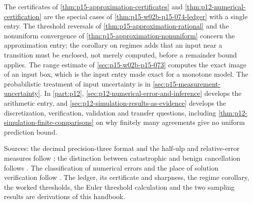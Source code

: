 The certificates of \cref{thm:p15-approximation-certificates} and
\cref{thm:p12-numerical-certification} are the special cases of
\cref{thm:p15-w02b-p15-074-ledger} with a single entry. The threshold
reversals of \cref{thm:p15-approximation-rational} and the nonuniform
convergence of \cref{thm:p15-approximation-nonuniform} concern the
approximation entry; the corollary on regimes adds that an input near a
transition must be enclosed, not merely computed, before a remainder bound
applies. The range estimate of \cref{sec:p15-w02b-p15-073} computes the
exact image of an input box, which is the input entry made exact for a
monotone model. The probabilistic treatment of input uncertainty is in
\cref{sec:p15-measurement-uncertainty}. In \cref{part:p12},
\cref{sec:p12-numerical-error-and-inference} develops the arithmetic
entry, and \cref{sec:p12-simulation-results-as-evidence} develops the
discretization, verification, validation and transfer questions,
including \cref{thm:p12-simulation-finite-comparisons} on why finitely many
agreements give no uniform prediction bound.

Sources: the decimal precision-three format and the half-ulp and
relative-error measures follow \cite[Section D.3.2]{GoldbergOracle8193693};
the distinction between catastrophic and benign cancellation follows
\cite[Section D.3.4]{GoldbergOracle8193693}. The classification of numerical
errors and the place of solution verification follow
\cite[Sections 4.2.3--4.2.4 and E.4.4]{NASA7009B2024}. The ledger, its
certificate and sharpness, the regime corollary, the worked thresholds, the
Euler threshold calculation and the two sampling results are derivations
of this handbook.

